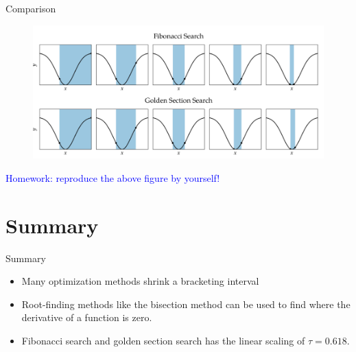 \documentclass{beamer}
\begin{document}
\begin{frame}{Comparison}

\begin{figure}
\centering
\includegraphics[width=120mm]{Figs/search.jpeg}
\end{figure}

\textcolor{blue}{Homework: reproduce the above figure by yourself!}
\end{frame}

\section{Summary}
\begin{frame}{Summary}
    \begin{itemize}
        \item Many optimization methods shrink a bracketing interval
        \item Root-finding methods like the bisection method can be used to find where the derivative of a function is zero.
        \item Fibonacci search and golden section search has the linear scaling of $\tau = 0.618$.
    \end{itemize}
\end{frame}
\end{document}
